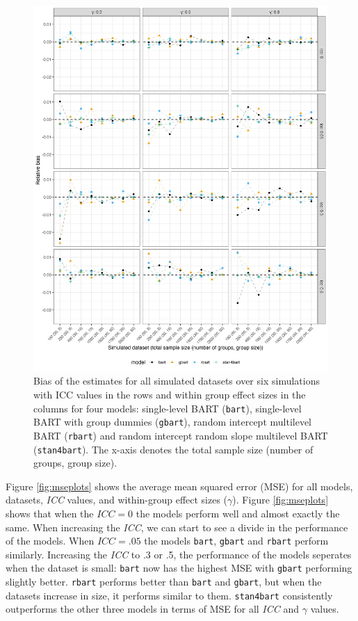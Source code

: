 \documentclass[10pt, a4paper, titlepage]{article}
\begin{document}
\begin{figure}[H]
\caption{Bias of the estimates for all simulated datasets over six simulations with ICC values in the rows and within group effect sizes in the columns for four models: single-level BART (\texttt{bart}), single-level BART with group dummies (\texttt{gbart}), random intercept multilevel BART (\texttt{rbart}) and random intercept random slope multilevel BART (\texttt{stan4bart}). The x-axis denotes the total sample size (number of groups, group size).}
\centering
\label{fig:biasplots}
\includegraphics[width=1\textwidth]{biasplot.png}
\end{figure}

Figure \ref{fig:mseplots} shows the average mean squared error (MSE) for all models, datasets, \textit{ICC} values, and within-group effect sizes ($\gamma$). Figure \ref{fig:mseplots} shows that when the $ICC = 0$ the models perform well and almost exactly the same. When increasing the \textit{ICC}, we can start to see a divide in the performance of the models. When $ICC = .05$ the models \texttt{bart}, \texttt{gbart} and \texttt{rbart} perform similarly. Increasing the \textit{ICC} to .3 or .5, the performance of the models seperates when the dataset is small: \texttt{bart} now has the highest MSE with \texttt{gbart} performing slightly better. \texttt{rbart} performs better than \texttt{bart} and \texttt{gbart}, but when the datasets increase in size, it performs similar to them. \texttt{stan4bart} consistently outperforms the other three models in terms of MSE for all \textit{ICC} and $\gamma$ values.
\end{document}
